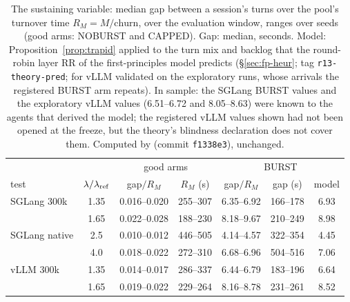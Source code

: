 \begin{table}[t]
\centering\footnotesize
\caption{The sustaining variable: median gap between a session's turns over the pool's turnover time $R_M=M/\text{churn}$, over the evaluation window, ranges over seeds (good arms: NOBURST and CAPPED). Gap: median, seconds. Model: Proposition~\ref{prop:trapid} applied to the turn mix and backlog that the round-robin layer RR of the first-principles model predicts (\S\ref{sec:fp-heur}; tag \texttt{r13-theory-pred}; for vLLM validated on the exploratory runs, whose arrivals the registered BURST arm repeats). In sample: the SGLang BURST values and the exploratory vLLM values (6.51--6.72 and 8.05--8.63) were known to the agents that derived the model; the registered vLLM values shown had not been opened at the freeze, but the theory's blindness declaration does not cover them. Computed by  (commit \texttt{f1338e3}), unchanged.}\label{tab:gapR}
\setlength{\tabcolsep}{2pt}
\begin{tabular}{@{}l c c c c c c@{}}
\toprule
 & & \multicolumn{2}{c}{good arms} & \multicolumn{3}{c}{BURST}\\
test & $\lambda/\lambda_{\mathrm{ref}}$ & gap$/R_M$ & $R_M$ (s) & gap$/R_M$ & gap (s) & model\\
\midrule
SGLang 300k & 1.35 & 0.016--0.020 & 255--307 & 6.35--6.92 & 166--178 & 6.93\\
            & 1.65 & 0.022--0.028 & 188--230 & 8.18--9.67 & 210--249 & 8.98\\
SGLang native & 2.5 & 0.010--0.012 & 446--505 & 4.14--4.57 & 322--354 & 4.45\\
            & 4.0 & 0.018--0.022 & 272--310 & 6.68--6.96 & 504--516 & 7.06\\
vLLM 300k   & 1.35 & 0.014--0.017 & 286--337 & 6.44--6.79 & 183--196 & 6.64\\
            & 1.65 & 0.019--0.022 & 229--264 & 8.16--8.78 & 231--261 & 8.52\\
\bottomrule
\end{tabular}
\end{table}

